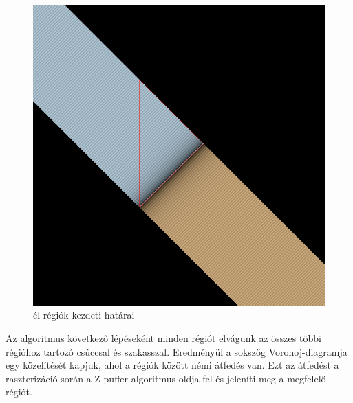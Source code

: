 \begin{figure}[H]
	\centering
	\includegraphics[width=.6\linewidth]{images/initial_segment_regions.png}
	\caption{él régiók kezdeti határai}
	\label{fig:initial_segment_regions-1}
\end{figure}

Az algoritmus következő lépéseként minden régiót elvágunk az összes többi régióhoz tartozó csúccsal és szakasszal. Eredményül a sokszög Voronoj-diagramja egy közelítését kapjuk, ahol a régiók között némi átfedés van. Ezt az átfedést a raszterizáció \cite{rasterization} során a Z-puffer \cite{depthtest} algoritmus oldja fel és jeleníti meg a megfelelő régiót.

